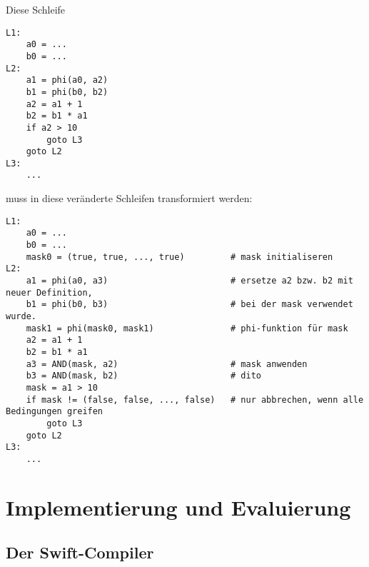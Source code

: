 \documentclass[a4paper,10pt]{article}
\begin{document}
Diese Schleife

\begin{verbatim}
L1:
    a0 = ...
    b0 = ...
L2:
    a1 = phi(a0, a2)
    b1 = phi(b0, b2)
    a2 = a1 + 1
    b2 = b1 * a1
    if a2 > 10
        goto L3
    goto L2
L3: 
    ...
\end{verbatim}

muss in diese veränderte Schleifen transformiert werden:

\begin{verbatim}
L1:
    a0 = ...
    b0 = ...
    mask0 = (true, true, ..., true)         # mask initialiseren
L2:
    a1 = phi(a0, a3)                        # ersetze a2 bzw. b2 mit neuer Definition, 
    b1 = phi(b0, b3)                        # bei der mask verwendet wurde.
    mask1 = phi(mask0, mask1)               # phi-funktion für mask
    a2 = a1 + 1
    b2 = b1 * a1
    a3 = AND(mask, a2)                      # mask anwenden
    b3 = AND(mask, b2)                      # dito
    mask = a1 > 10
    if mask != (false, false, ..., false)   # nur abbrechen, wenn alle Bedingungen greifen
        goto L3
    goto L2
L3: 
    ...
\end{verbatim}

\newpage
\section{Implementierung und Evaluierung}

\subsection{Der Swift-Compiler}
\end{document}
